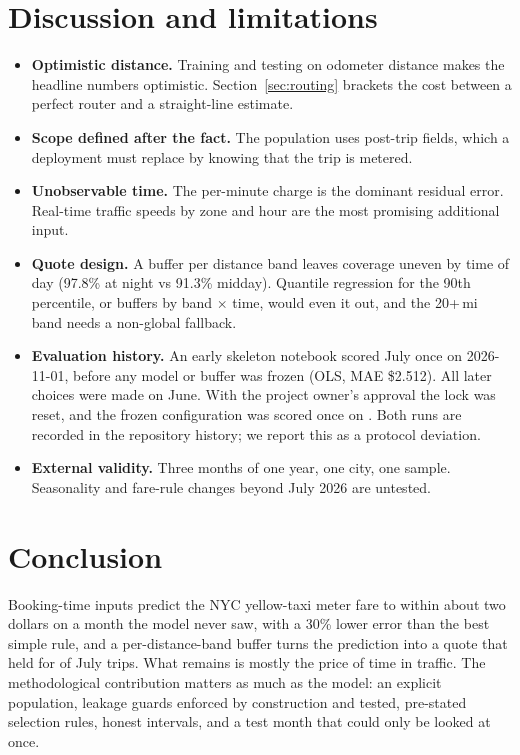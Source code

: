 \documentclass[11pt,a4paper]{article}
\newcommand{\usd}[1]{\$#1}%
\begin{document}
\section{Discussion and limitations}
\begin{itemize}
  \item \textbf{Optimistic distance.} Training and testing on odometer distance makes the headline numbers optimistic. Section~\ref{sec:routing} brackets the cost between a perfect router and a straight-line estimate.
  \item \textbf{Scope defined after the fact.} The population uses post-trip fields, which a deployment must replace by knowing that the trip is metered.
  \item \textbf{Unobservable time.} The per-minute charge is the dominant residual error. Real-time traffic speeds by zone and hour are the most promising additional input.
  \item \textbf{Quote design.} A buffer per distance band leaves coverage uneven by time of day (97.8\% at night vs 91.3\% midday). Quantile regression for the 90th percentile, or buffers by band $\times$ time, would even it out, and the 20+\,mi band needs a non-global fallback.
  \item \textbf{Evaluation history.} An early skeleton notebook scored July once on 2026-11-01, before any model or buffer was frozen (OLS, MAE \usd{2.512}). All later choices were made on June. With the project owner's approval the lock was reset, and the frozen configuration was scored once on \JulyScoredAt. Both runs are recorded in the repository history; we report this as a protocol deviation.
  \item \textbf{External validity.} Three months of one year, one city, one sample. Seasonality and fare-rule changes beyond July 2026 are untested.
\end{itemize}

\section{Conclusion}
Booking-time inputs predict the NYC yellow-taxi meter fare to within about two dollars on a month the model never saw, with a 30\% lower error than the best simple rule, and a per-distance-band buffer turns the prediction into a quote that held for \JulyQuoteCoverage{} of July trips. What remains is mostly the price of time in traffic. The methodological contribution matters as much as the model: an explicit population, leakage guards enforced by construction and tested, pre-stated selection rules, honest intervals, and a test month that could only be looked at once.
\end{document}

